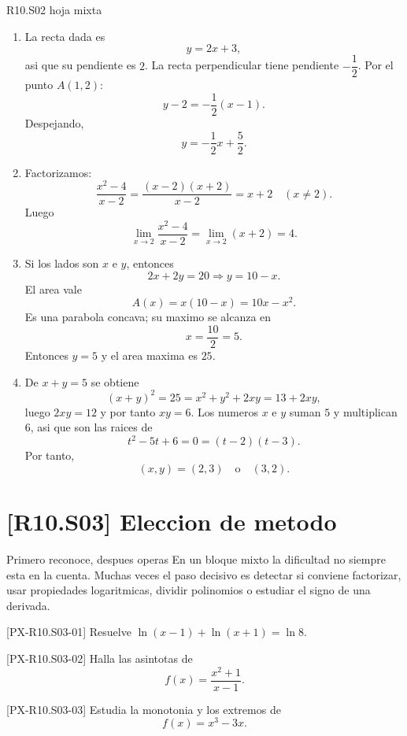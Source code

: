 \begin{fullsolution}{R10.S02 hoja mixta}
\begin{enumerate}[label=\textbf{PX-R10.S02-\arabic*:}, leftmargin=*]
  \item La recta dada es
  \[
  y=2x+3,
  \]
  asi que su pendiente es \(2\). La recta perpendicular tiene pendiente \(-\dfrac{1}{2}\). Por
  el punto \(A(1,2)\):
  \[
  y-2=-\frac{1}{2}(x-1).
  \]
  Despejando,
  \[
  y=-\frac{1}{2}x+\frac{5}{2}.
  \]
  \item Factorizamos:
  \[
  \frac{x^2-4}{x-2}=\frac{(x-2)(x+2)}{x-2}=x+2 \quad (x\neq 2).
  \]
  Luego
  \[
  \lim_{x\to 2}\frac{x^2-4}{x-2}=\lim_{x\to 2}(x+2)=4.
  \]
  \item Si los lados son \(x\) e \(y\), entonces
  \[
  2x+2y=20 \Longrightarrow y=10-x.
  \]
  El area vale
  \[
  A(x)=x(10-x)=10x-x^2.
  \]
  Es una parabola concava; su maximo se alcanza en
  \[
  x=\frac{10}{2}=5.
  \]
  Entonces \(y=5\) y el area maxima es \(25\).
  \item De \(x+y=5\) se obtiene
  \[
  (x+y)^2=25=x^2+y^2+2xy=13+2xy,
  \]
  luego \(2xy=12\) y por tanto \(xy=6\). Los numeros \(x\) e \(y\) suman \(5\) y multiplican
  \(6\), asi que son las raices de
  \[
  t^2-5t+6=0=(t-2)(t-3).
  \]
  Por tanto,
  \[
  (x,y)=(2,3)\quad \text{o}\quad (3,2).
  \]
\end{enumerate}
\end{fullsolution}

\section{[R10.S03] Eleccion de metodo}

\begin{theorybox}{Primero reconoce, despues operas}
En un bloque mixto la dificultad no siempre esta en la cuenta. Muchas veces el paso decisivo es
detectar si conviene factorizar, usar propiedades logaritmicas, dividir polinomios o estudiar
el signo de una derivada.
\end{theorybox}

\begin{exercise}{[PX-R10.S03-01] Resuelve \(\ln(x-1)+\ln(x+1)=\ln 8\).}
\end{exercise}

\begin{exercise}{[PX-R10.S03-02] Halla las asintotas de
\[
f(x)=\frac{x^2+1}{x-1}.
\]}
\end{exercise}

\begin{exercise}{[PX-R10.S03-03] Estudia la monotonia y los extremos de
\[
f(x)=x^3-3x.
\]}
\end{exercise}

